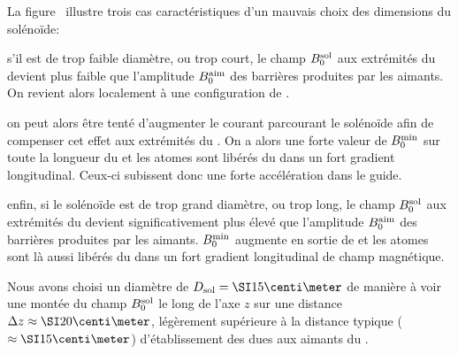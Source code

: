 \noindent
La figure~ illustre trois cas caractéristiques d'un mauvais choix des dimensions du solénoïde:
\begin{itemizel}
	\item s'il est de trop faible diamètre, ou trop court, le champ ${B_{0}^{\rm sol}}$ aux extrémités du \tp devient plus faible que l'amplitude ${B_{0}^{\rm aim}}$ des barrières produites par les aimants. On revient alors localement à une configuration de \pqp.
	\item on peut alors être tenté d'augmenter le courant parcourant le solénoïde afin de compenser cet effet aux extrémités du \tp. On a alors une forte valeur de ${B_{0}^{\rm min}}$ sur toute la longueur du \conv et les atomes sont libérés du \tp dans un fort gradient longitudinal. Ceux-ci subissent donc une forte accélération dans le guide.
	\item enfin, si le solénoïde est de trop grand diamètre, ou trop long, le champ ${B_{0}^{\rm sol}}$ aux extrémités du \tp devient significativement plus élevé que l'amplitude ${B_{0}^{\rm aim}}$ des barrières produites par les aimants. ${B_{0}^{\rm min}}$ augmente en sortie de \conv et les atomes sont là aussi libérés du \tp dans un fort gradient longitudinal de champ magnétique. 
\end{itemizel}
%
\bfigh
\RemonteUnPeuFig
{}
\label{fig:ConvAnimIPChampLongDefauts}
\efigh

Nous avons choisi un diamètre de $\ConvDSpire = \cm{15}$ de manière à voir une montée du champ ${B_{0}^{\rm sol}}$ le long de l'axe $z$ sur une distance $\Delta z \approx \cm{20}$, légèrement supérieure à la distance typique ($\approx \cm{15}$) d'établissement des \bapots dues aux aimants du \conv. 

\vspace{5cm}

